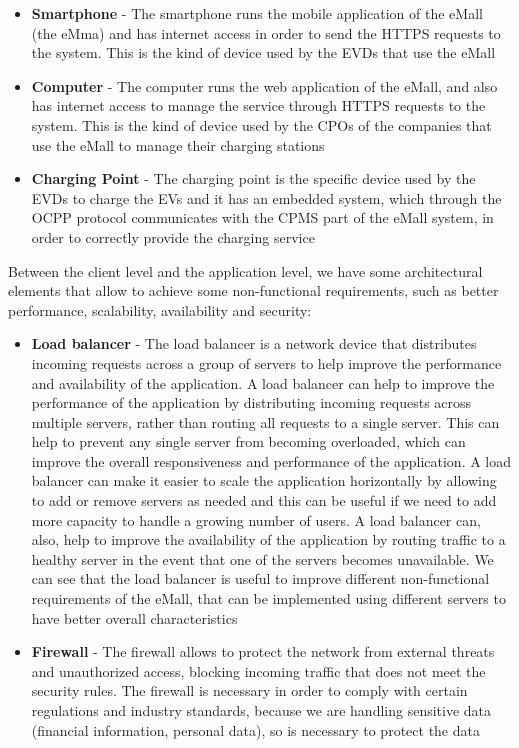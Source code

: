 \begin{itemize}
    \item \textbf{Smartphone} - The smartphone runs the mobile application of the eMall (the eMma) and has internet access in order to send the HTTPS requests to the system. This is the kind of device used by the EVDs that use the eMall
    \item \textbf{Computer} - The computer runs the web application of the eMall, and also has internet access to manage the service through HTTPS requests to the system. This is the kind of device used by the CPOs of the companies that use the eMall to manage their charging stations
    \item \textbf{Charging Point} - The charging point is the specific device used by the EVDs to charge the EVs and it has an embedded system, which through the OCPP protocol communicates with the CPMS part of the eMall system, in order to correctly provide the charging service
\end{itemize}

Between the client level and the application level, we have some architectural elements that allow to achieve some non-functional requirements, such as better performance, scalability, availability and security:
\begin{itemize}
    \item \textbf{Load balancer} - The load balancer is a network device that distributes incoming requests across a group of servers to help improve the performance and availability of the application. A load balancer can help to improve the performance of the application by distributing incoming requests across multiple servers, rather than routing all requests to a single server. This can help to prevent any single server from becoming overloaded, which can improve the overall responsiveness and performance of the application. A load balancer can make it easier to scale the application horizontally by allowing to add or remove servers as needed and this can be useful if we need to add more capacity to handle a growing number of users. A load balancer can, also, help to improve the availability of the application by routing traffic to a healthy server in the event that one of the servers becomes unavailable. We can see that the load balancer is useful to improve different non-functional requirements of the eMall, that can be implemented using different servers to have better overall characteristics 
    \item \textbf{Firewall} - The firewall allows to protect the network from external threats and unauthorized access, blocking incoming traffic that does not meet the security rules. The firewall is necessary in order to comply with certain regulations and industry standards, because we are handling sensitive data (financial information, personal data), so is necessary to protect the data
\end{itemize}

